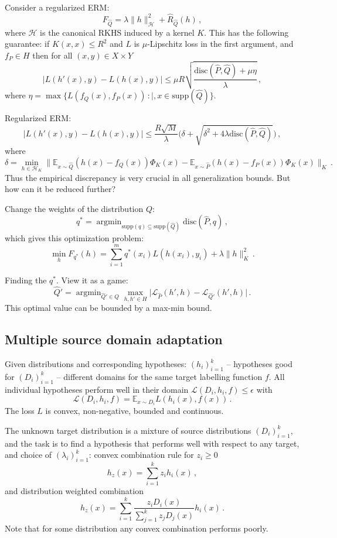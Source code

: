 \documentclass[a4paper]{article}
\newcommand{\ex}{\mathbb{E}}
\newcommand{\argmin}{\mathop{\text{argmin}}}
\newcommand{\Hcal}{\mathcal{H}}
\begin{document}
Consider a regularized ERM:
\[F_{\hat{Q}} = \lambda \|h\|^2_\Hcal + \hat{R}_{\hat{Q}}(h) \,,\]
where $\Hcal$ is the canonical RKHS induced by a kernel $K$. This has the following
guarantee: if $K(x,x) \leq R^2$ and $L$ is $\mu$-Lipschitz loss in the first argument,
and $f_P\in H$ then for all $(x, y)\in X\times Y$
\[ | L(h'(x), y) - L(h(x), y) |
    \leq \mu R \sqrt{\frac{\text{disc}(\hat{P}, \hat{Q}) + \mu \eta}{\lambda}}
    \,, \]
where $\eta = \max\{L(f_Q(x), f_P(x))\,:|, x\in \text{supp}(\hat{Q}) \}$.

Regularized ERM:
\[ | L(h'(x), y) - L(h(x), y) |
    \leq \frac{R\sqrt{M}}{\lambda}\biggl(
    \delta + \sqrt{\delta^2 + 4\lambda \text{disc}(\hat{P}, \hat{Q})}
    \biggr) \,, \]
where
\[\delta = \min_{h\in \Hcal_K}\biggl\|
    \ex_{x\sim \hat{Q}} (h(x) - f_Q(x))\Phi_K(x)
    - \ex_{x\sim \hat{P}} (h(x) - f_P(x))\Phi_K(x)
    \biggr\|_K
\,.\]
Thus the empirical discrepancy is very crucial in all generalization bounds. But
how can it be reduced further?

Change the weights of the distribution $Q$:
\[ q^* = \argmin_{\text{supp}(q) \subseteq \text{supp}(\hat{Q})} 
        \text{disc}(\hat{P}, q)
    \,,\]
which gives this optimization problem:
\[ \min_h F_{q^*}(h)
    = \sum_{i=1}^m q^*(x_i) L(h(x_i), y_i) + \lambda \|h\|^2_K
    \,. \]

Finding the $q^*$. View it as a game:
\[ \hat{Q}' = \argmin_{\hat{Q}'\in Q} \max_{h,h'\in H}
    \bigl| \mathcal{L}_{\hat{P}}(h',h) - \mathcal{L}_{\hat{Q}'}(h',h) \bigr|
    \,. \]
This optimal value can be bounded by a max-min bound.



\subsection{Multiple source domain adaptation} %
\label{sub:multiple_source_domain_adaptation}

Given distributions and corresponding hypotheses: $(h_i)_{i=1}^k$ -- hypotheses
good for $(D_i)_{i=1}^k$ -- different domains for the same target labelling function
$f$. All individual hypotheses perform well in their domain $\mathcal{L}(D_i, h_i, f) \leq \epsilon$
with
\[ \mathcal{L}(D_i, h_i, f) = \ex_{x\sim D_i}L(h_i(x), f(x)) \,.\]
The loss $L$ is convex, non-negative, bounded and continuous.

The unknown target distribution is a mixture of source distributions $(D_i)_{i=1}^k$,
and the task is to find a hypothesis that performs well with respect to any target, 
and choice of $(\lambda_i)_{i=1}^k$: convex combination rule for $z_i\geq 0$
\[ h_z(x) = \sum_{i=1}^k z_i h_i(x) \,,\]
and distribution weighted combination
\[ h_z(x) = \sum_{i=1}^k \frac{z_i D_i(x)}{\sum_{j=1}^k z_j D_j(x)} h_i(x) \,.\]
Note that for some distribution any convex combination performs poorly.
\end{document}
